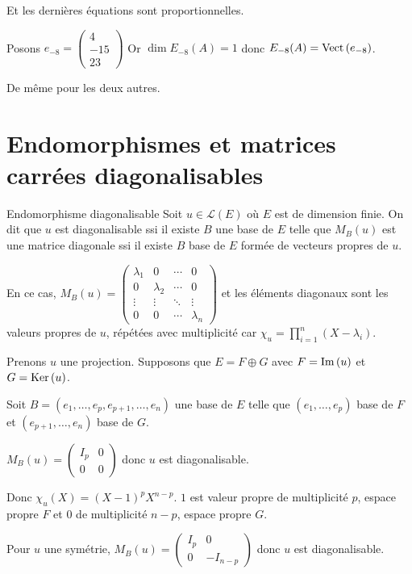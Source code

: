 \begin{exemple}
    Et les dernières équations sont proportionnelles. 

    Posons $e_{-8} = \begin{pmatrix}
        4 \\ 
        -15 \\
        23
    \end{pmatrix}$ Or $\dim E_{-8}(A) = 1$ donc $E_{-8}(A) = \operatorname{Vect} \,(e_{-8})$.

    De même pour les deux autres. 
\end{exemple}

\section{Endomorphismes et matrices carrées diagonalisables}

\begin{definition}{Endomorphisme diagonalisable}{}
    Soit $u \in \mathscr L(E)$ où $E$ est de dimension finie. On dit que $u$ est diagonalisable ssi il existe 
    $B$ une base de $E$ telle que $M_B(u)$ est une matrice diagonale ssi il existe 
    $B$ base de $E$ formée de vecteurs propres de $u$.

    En ce cas, $M_B(u) = \begin{pmatrix}
        \lambda_1 & 0 & \cdots & 0 \\
        0 & \lambda_2 & \cdots & 0 \\
        \vdots & \vdots & \ddots & \vdots \\
        0 & 0 & \cdots & \lambda_n
    \end{pmatrix}$ et les éléments diagonaux sont les valeurs propres de $u$, répétées avec multiplicité car 
    $\displaystyle \chi_u = \prod_{i = 1 }^{ n } (X - \lambda_i)$.
\end{definition}

\begin{exemple}
    Prenons $u$ une projection. Supposons que $E = F \oplus G$ avec $F = \operatorname{Im} \,(u)$ et $G = \operatorname{Ker} \,(u)$.

    Soit $B = (e_1, \dots, e_p, e_{p + 1}, \dots, e_n)$ une base de $E$ telle que 
    $(e_1, \dots, e_p)$ base de $F$ et $(e_{p + 1}, \dots, e_n)$ base de $G$.

    $M_B(u) = \begin{pmatrix}
        I_p & 0 \\
        0 & 0
    \end{pmatrix}$ donc $u$ est diagonalisable.

    Donc $\chi_u(X) = (X - 1)^p X^{n - p}$. $1$ est valeur propre de multiplicité $p$, espace propre 
    $F$ et $0$ de multiplicité $n - p$, espace propre $G$.

    \lvspace Pour $u$ une symétrie, $M_B(u) = \begin{pmatrix}
        I_p & 0 \\
        0 & -I_{n - p}
    \end{pmatrix}$ donc $u$ est diagonalisable.
\end{exemple}

